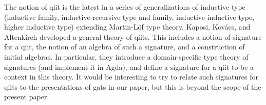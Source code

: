 \documentclass{lmcs}
\newcommand{\FYI}[1]{{\color{red}#1}}
\begin{document}
%


The notion of qiit is the latest in a series of generalizations of inductive type (inductive family, inductive-recursive type and family, inductive-inductive type, higher inductive type) extending Martin-Löf type theory. Kaposi, Kov{\'{a}}cs, and Altenkirch \cite{kaposi:qiits} developed a general theory of qiits. This includes a notion of signature for a qiit, the notion of an algebra of such a signature, and a construction of initial algebras. In particular, they introduce a domain-specific type theory of signatures (and implement it in Agda), and define a signature for a qiit to be a context in this theory. It would be interesting to try to relate such signatures for qiits to the \FYI{presentations} of gats in our paper, but this is beyond the scope of the present paper.
\end{document}
